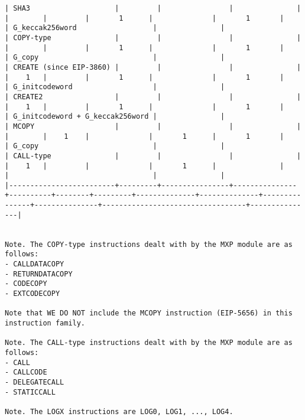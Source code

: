 \documentclass[varwidth=\maxdimen,margin=0.5cm,multi={verbatim}]{standalone}
\begin{document}
\begin{verbatim}
| SHA3                    |         |                |               |          |        |         |       1      |              |       1       |               | G_keccak256word                  |               |
| COPY-type               |         |                |               |          |        |         |       1      |              |       1       |               | G_copy                           |               |
| CREATE (since EIP-3860) |         |                |               |          |    1   |         |       1      |              |       1       |               | G_initcodeword                   |               |
| CREATE2                 |         |                |               |          |    1   |         |       1      |              |       1       |               | G_initcodeword + G_keccak256word |               |
| MCOPY                   |         |                |               |          |        |    1    |              |       1      |       1       |               | G_copy                           |               |
| CALL-type               |         |                |               |          |    1   |         |              |       1      |               |               |                                  |               |
|-------------------------+---------+----------------+---------------+----------+--------+---------+--------------+--------------+---------------+---------------+----------------------------------+---------------|


Note. The COPY-type instructions dealt with by the MXP module are as follows:
- CALLDATACOPY
- RETURNDATACOPY
- CODECOPY
- EXTCODECOPY

Note that WE DO NOT include the MCOPY instruction (EIP-5656) in this instruction family.

Note. The CALL-type instructions dealt with by the MXP module are as follows:
- CALL
- CALLCODE
- DELEGATECALL
- STATICCALL

Note. The LOGX instructions are LOG0, LOG1, ..., LOG4.

\end{verbatim}
\end{document}
